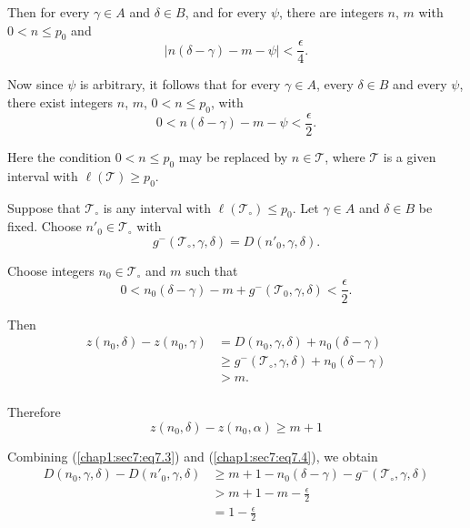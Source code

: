 Then for every $\gamma \in A$ and $\delta \in B$, and for every $\psi$, there are integers $n$, $m$ with $0 < n \leq p_{0}$ and
$$
|n(\delta - \gamma) - m - \psi| < \frac{\epsilon}{4}.
$$ 

Now since $\psi$ is arbitrary, it follows that for every $\gamma \in A$, every $\delta \in B$ and every $\psi$, there exist integers $n$, $m$, $0 < n \leq p_{0}$, with
$$
0 < n(\delta - \gamma) - m - \psi < \frac{\epsilon}{2}.
$$

Here the condition $0 < n \leq p_{0}$ may be replaced by $n \in \mathscr{T}$, where $\mathscr{T}$ is a given interval with $\ell (\mathscr{T}) \geq p_{0}$.

Suppose that $\mathscr{T}_{\circ}$ is any interval with $\ell (\mathscr{T}_{\circ}) \leq p_{0}$. Let $\gamma \in A$ and $\delta \in B$ be fixed. Choose $n'_{0} \in \mathscr{T}_{\circ}$ with
$$
g^{-} (\mathscr{T}_{\circ}, \gamma, \delta) = D(n'_{0}, \gamma, \delta).
$$

Choose integers $n_{0} \in \mathscr{T}_{\circ}$ and $m$ such that
\begin{equation*}
0 < n_{0} (\delta - \gamma)- m + g^{-} (\mathscr{T}_{0}, \gamma, \delta) < \frac{\epsilon}{2}.\tag{7.3}\label{chap1:sec7:eq7.3}
\end{equation*}

Then
\begin{align*}
z(n_{0}, \delta) - z(n_{0}, \gamma) & = D(n_{0}, \gamma, \delta) + n_{0} (\delta - \gamma)\\
& \geq g^{-} (\mathscr{T}_{\circ}, \gamma, \delta) + n_{0} (\delta - \gamma)\\
& > m.\\
\end{align*}

Therefore\pageoriginale
\begin{equation*}
z(n_{0}, \delta) - z(n_{0}, \alpha) \geq m+1\tag{7.4}\label{chap1:sec7:eq7.4}
\end{equation*}

Combining (\ref{chap1:sec7:eq7.3}) and (\ref{chap1:sec7:eq7.4}), we obtain
\begin{align*}
D(n_{0}, \gamma, \delta) -D(n'_{0}, \gamma, \delta) & \geq m+1 -n_{0} (\delta - \gamma) - g^{-} (\mathscr{T}_{\circ}, \gamma, \delta)\\
& > m + 1 - m - \frac{\epsilon}{2}\\
 & = 1 - \frac{\epsilon}{2}\tag{7.5}\label{chap1:sec7:eq7.5}
\end{align*}

